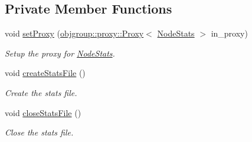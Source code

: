 \subsection*{Private Member Functions}
\begin{DoxyCompactItemize}
\item 
void \hyperlink{structvt_1_1vrt_1_1collection_1_1balance_1_1_node_stats_a30e9e5def6e7d6d31cd6597c5fea2345}{set\+Proxy} (\hyperlink{structvt_1_1objgroup_1_1proxy_1_1_proxy}{objgroup\+::proxy\+::\+Proxy}$<$ \hyperlink{structvt_1_1vrt_1_1collection_1_1balance_1_1_node_stats}{Node\+Stats} $>$ in\+\_\+proxy)
\begin{DoxyCompactList}\small\item\em Setup the proxy for {\ttfamily \hyperlink{structvt_1_1vrt_1_1collection_1_1balance_1_1_node_stats}{Node\+Stats}}. \end{DoxyCompactList}\item 
void \hyperlink{structvt_1_1vrt_1_1collection_1_1balance_1_1_node_stats_a2da26dd82180cbc721fce9c8aa1814a4}{create\+Stats\+File} ()
\begin{DoxyCompactList}\small\item\em Create the stats file. \end{DoxyCompactList}\item 
void \hyperlink{structvt_1_1vrt_1_1collection_1_1balance_1_1_node_stats_abd5133b734537e6a9190e9976f009f89}{close\+Stats\+File} ()
\begin{DoxyCompactList}\small\item\em Close the stats file. \end{DoxyCompactList}\end{DoxyCompactItemize}
